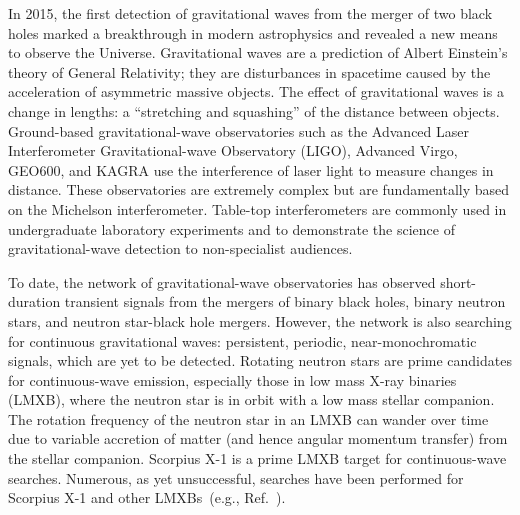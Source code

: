 \documentclass[paper-main.tex]{subfiles}
\begin{document}
In 2015, the first detection of gravitational waves from the merger of two black holes marked a breakthrough in modern astrophysics and revealed a new means to observe the Universe.\cite{GW150914}
Gravitational waves are a prediction of Albert Einstein's theory of General Relativity; they are disturbances in spacetime caused by the acceleration of asymmetric massive objects.
The effect of gravitational waves is a change in lengths: a ``stretching and squashing'' of the distance between objects. 
Ground-based gravitational-wave observatories such as the Advanced Laser Interferometer Gravitational-wave Observatory (LIGO), Advanced Virgo, GEO600, and KAGRA use the interference of laser light to measure changes in distance. 
These observatories are extremely complex but are fundamentally based on the Michelson interferometer. 
Table-top interferometers are commonly used in undergraduate laboratory experiments and to demonstrate the science of gravitational-wave detection to non-specialist audiences.\cite{TTExhibit:2021}


To date, the network of gravitational-wave observatories has observed short-duration transient signals from the mergers of binary black holes, binary neutron stars, and neutron star-black hole mergers.\cite{GWTC-2:2020,NSBH:2021}
However, the network is also searching for continuous gravitational waves: persistent, periodic, near-monochromatic signals, which are yet to be detected. 
Rotating neutron stars are prime candidates for continuous-wave emission, especially those in low mass X-ray binaries (LMXB), where the neutron star is in orbit with a low mass stellar companion.
The rotation frequency of the neutron star in an LMXB can wander over time due to variable accretion of matter (and hence angular momentum transfer) from the stellar companion.\cite{xraybinaries:1997}
Scorpius X-1 is a prime LMXB target for continuous-wave searches. 
Numerous, as yet unsuccessful, searches have been performed for Scorpius X-1 and other LMXBs~(e.g., Ref.~\cite{ScoX1O2Viterbi:2019}). 
\end{document}
